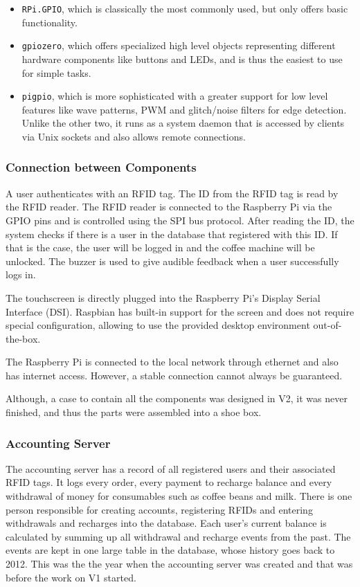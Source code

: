 \documentclass[12pt]{article}
\begin{document}
\begin{itemize}
  \item \texttt{RPi.GPIO}, which is classically the most commonly used, but only offers basic functionality.
  \item \texttt{gpiozero}, which offers specialized high level objects representing different hardware components like buttons and LEDs,
        and is thus the easiest to use for simple tasks.
  \item \texttt{pigpio}, which is more sophisticated with a greater support for low level features like wave patterns,
        PWM and glitch/noise filters for edge detection.
        Unlike the other two, it runs as a system daemon that is accessed by clients via Unix sockets and also allows remote connections.
\end{itemize}

\subsubsection{Connection between Components}
A user authenticates with an RFID tag. The ID from the RFID tag is read by the RFID reader. 
The RFID reader is connected to the Raspberry Pi via the GPIO pins and is controlled using the SPI bus protocol.
After reading the ID, the system checks if there is a user in the database that registered with this ID.
If that is the case, the user will be logged in and the coffee machine will be unlocked.
The buzzer is used to give audible feedback when a user successfully logs in.

The touchscreen is directly plugged into the Raspberry Pi's Display Serial Interface (DSI).
Raspbian has built-in support for the screen and does not require special configuration,
allowing to use the provided desktop environment out-of-the-box.

The Raspberry Pi is connected to the local network through ethernet and also has internet access.
However, a stable connection cannot always be guaranteed.

Although, a case to contain all the components was designed in V2,
it was never finished, and thus the parts were assembled into a shoe box.

\subsubsection{Accounting Server}
The accounting server has a record of all registered users and their associated RFID tags.
It logs every order, every payment to recharge balance and
every withdrawal of money for consumables such as coffee beans and milk.
There is one person responsible for creating accounts,
registering RFIDs and entering withdrawals and recharges into the database.
Each user's current balance is calculated by summing up all withdrawal and recharge events from the past.
The events are kept in one large table in the database, whose history goes back to 2012.
This was the the year when the accounting server was created and that was before the work on V1 started.
\end{document}
